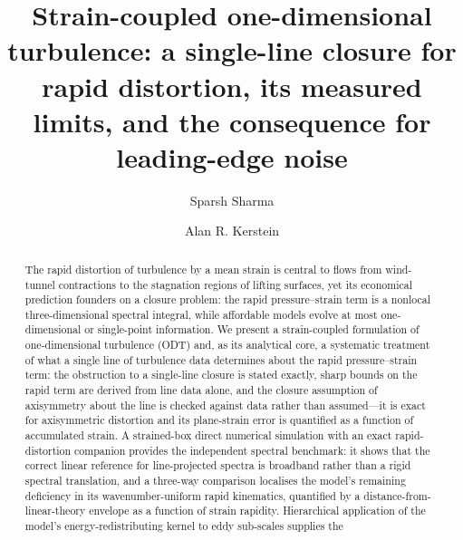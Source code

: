 \documentclass[lineno]{JFM-FLM_Au}
\title{Strain-coupled one-dimensional turbulence: a single-line closure
for rapid distortion, its measured limits, and the consequence for
leading-edge noise}
\author{Sparsh Sharma\aff{1} \and Alan R. Kerstein\aff{2}}
\affiliation{\aff{1}German Aerospace Center (DLR), 38108 Braunschweig, Germany
\aff{2}Consultant, Danville, CA 94526, USA}
\newcounter{assumption}
\begin{document}
\maketitle

\begin{abstract}
The rapid distortion of turbulence by a mean strain is central to flows
from wind-tunnel contractions to the stagnation regions of lifting
surfaces, yet its economical prediction founders on a closure problem: the
rapid pressure--strain term is a nonlocal three-dimensional spectral
integral, while affordable models evolve at most one-dimensional or
single-point information. We present a strain-coupled formulation of
one-dimensional turbulence (ODT) and, as its analytical core, a systematic
treatment of what a single line of turbulence data determines about the
rapid pressure--strain term: the obstruction to a single-line closure is
stated exactly, sharp bounds on the rapid term are derived from line data
alone, and the closure assumption of axisymmetry about the line is checked against data rather than assumed---it is exact for axisymmetric distortion and its
plane-strain error is quantified as a function of accumulated strain.
A strained-box direct numerical simulation with an exact rapid-distortion
companion provides the independent spectral benchmark: it shows that the
correct linear reference for line-projected spectra is broadband rather
than a rigid spectral translation, and a three-way comparison localises
the model's remaining deficiency in its wavenumber-uniform rapid
kinematics, quantified by a distance-from-linear-theory envelope as a
function of strain rapidity. Hierarchical application of the model's
energy-redistributing kernel to eddy sub-scales supplies the

\end{abstract}
\end{document}
